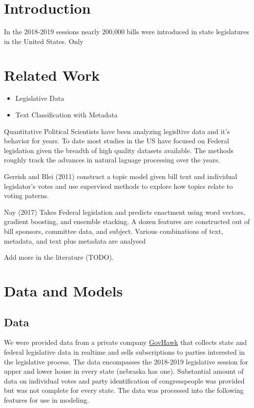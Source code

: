 \documentclass[11pt]{article}
\begin{document}
\section{Introduction}

In the 2018-2019 sessions nearly 200,000 bills were introduced in state legislatures in the United States. Only 

\section{Related Work}

\begin{itemize}
  \item Legislative Data
  \item Text Classification with Metadata
\end{itemize}

Quantitative Political Scientists have been analyzing legisltive data and it's behavior for years. To date most studies in the US have focused on Federal
legislation given the breadth of high quality datasets available. The methods roughly track the advances in natural laguage processing over the years.

Gerrish and Blei (2011)\cite{Gerrish} construct a topic model given bill text and individual legislator's votes and use supervised methods to explore how
topics relate to voting paterns.

Nay (2017) \cite{nay2017} Takes Federal legislation and predicts enactment using word vectors, gradient boosting, and ensemble stacking. A dozen features
are constructed out of bill sponsors, committee data, and subject. Various combinations of text, metadata, and text plus metadata are analysed 

Add more in the literature (TODO).

\section{Data and Models}

\subsection{Data}

We were provided data from a private company \href{https://govhawk.com/}{GovHawk} that collects state and federal legislative data in realtime and 
sells subscriptions to parties interested in the legislative process. The data encompasses the 2018-2019 legislative session for upper and lower house in
every state (nebraska has one). Substantial amount of data on individual votes and party identification of congresspeople was provided but was not complete for
every state. The data was processed into the following features for use in modeling.
\end{document}
